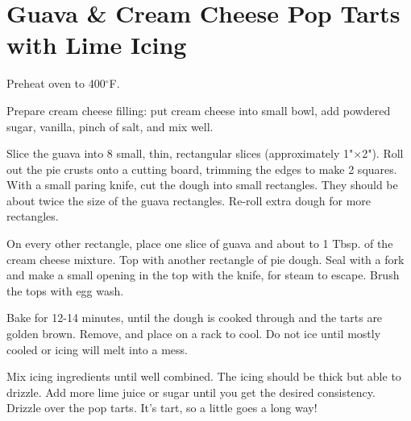 \section[Guava \& Cream Cheese Pop Tarts]{Guava \& Cream Cheese Pop Tarts with Lime Icing}
\begin{recipe}



	Preheat oven to 400$^{\circ}$F.

	Prepare cream cheese filling: put cream cheese into small bowl, add powdered sugar, vanilla, pinch of salt, and mix well.

	Slice the guava into 8 small, thin, rectangular slices (approximately 1"$\times$2"). Roll out the pie crusts onto a cutting board, trimming the edges to make 2 squares. With a small paring knife, cut the dough into small rectangles. They should be about twice the size of the guava rectangles. Re-roll extra dough for more rectangles.

	On every other rectangle, place one slice of guava and about  to 1 Tbsp. of the cream cheese mixture. Top with another rectangle of pie dough. Seal with a fork and make a small opening in the top with the knife, for steam to escape. Brush the tops with egg wash.

	Bake for 12-14 minutes, until the dough is cooked through and the tarts are golden brown. Remove, and place on a rack to cool. Do not ice until mostly cooled or icing will melt into a mess.


	Mix icing ingredients until well combined. The icing should be thick but able to drizzle. Add more lime juice or sugar until you get the desired consistency. Drizzle over the pop tarts. It's tart, so a little goes a long way!



\end{recipe}
